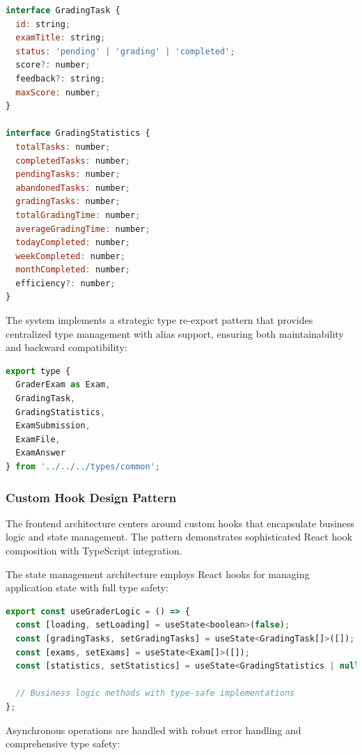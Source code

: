 \documentclass[12pt]{article}
\begin{document}
\begin{lstlisting}[language=JavaScript]
interface GradingTask {
  id: string;
  examTitle: string;
  status: 'pending' | 'grading' | 'completed';
  score?: number;
  feedback?: string;
  maxScore: number;
}

interface GradingStatistics {
  totalTasks: number;
  completedTasks: number;
  pendingTasks: number;
  abandonedTasks: number;
  gradingTasks: number;
  totalGradingTime: number;
  averageGradingTime: number;
  todayCompleted: number;
  weekCompleted: number;
  monthCompleted: number;
  efficiency?: number;
}
\end{lstlisting}

The system implements a strategic type re-export pattern that provides centralized type management with alias support, ensuring both maintainability and backward compatibility:

\begin{lstlisting}[language=JavaScript]
export type { 
  GraderExam as Exam, 
  GradingTask, 
  GradingStatistics,
  ExamSubmission,
  ExamFile,
  ExamAnswer
} from '../../../types/common';
\end{lstlisting}

\subsubsection{Custom Hook Design Pattern}

The frontend architecture centers around custom hooks that encapsulate business logic and state management. The pattern demonstrates sophisticated React hook composition with TypeScript integration.

The state management architecture employs React hooks for managing application state with full type safety:

\begin{lstlisting}[language=JavaScript]
export const useGraderLogic = () => {
  const [loading, setLoading] = useState<boolean>(false);
  const [gradingTasks, setGradingTasks] = useState<GradingTask[]>([]);
  const [exams, setExams] = useState<Exam[]>([]);
  const [statistics, setStatistics] = useState<GradingStatistics | null>(null);
  
  // Business logic methods with type-safe implementations
};
\end{lstlisting}

Asynchronous operations are handled with robust error handling and comprehensive type safety:
\end{document}
